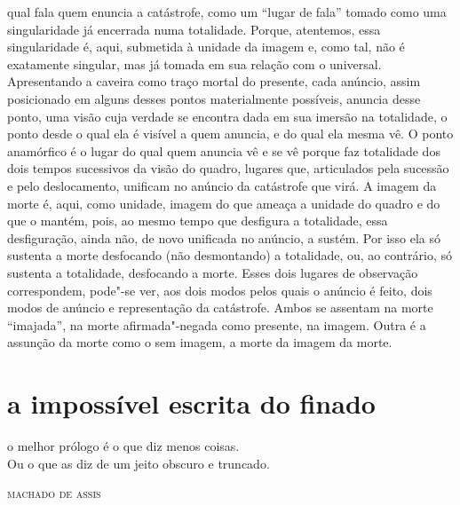 qual fala quem enuncia a catástrofe, como um ``lugar de fala'' tomado
como uma singularidade já encerrada numa totalidade. Porque, atentemos,
essa singularidade é, aqui, submetida à unidade da imagem e, como tal,
não é exatamente singular, mas já tomada em sua relação com o universal.
Apresentando a caveira como traço mortal do presente, cada anúncio,
assim posicionado em alguns desses pontos materialmente possíveis,
anuncia desse ponto, uma visão cuja verdade se encontra dada em sua
imersão na totalidade, o ponto desde o qual ela é visível a quem
anuncia, e do qual ela mesma vê. O ponto anamórfico é o lugar do qual
quem anuncia vê e se vê porque faz totalidade dos dois tempos sucessivos
da visão do quadro, lugares que, articulados pela sucessão e pelo
deslocamento, unificam no anúncio da catástrofe que virá. A imagem da
morte é, aqui, como unidade, imagem do que ameaça a unidade do quadro e
do que o mantém, pois, ao mesmo tempo que desfigura a totalidade, essa
desfiguração, ainda não, de novo unificada no anúncio, a sustém. Por
isso ela só sustenta a morte desfocando (não desmontando) a totalidade,
ou, ao contrário, só sustenta a totalidade, desfocando a morte. Esses
dois lugares de observação correspondem, pode"-se ver, aos dois modos
pelos quais o anúncio é feito, dois modos de anúncio e representação da
catástrofe. Ambos se assentam na morte ``imajada'', na morte
afirmada"-negada como presente, na imagem. Outra é a assunção da morte
como o sem imagem, a morte da imagem da morte.

\section{a impossível escrita do finado}


{\setlength{\epigraphwidth}{.55\textwidth}
\epigraph{o melhor prólogo é o que diz menos coisas.\\
Ou o que as diz de um jeito obscuro e truncado.}{\textsc{machado de assis}}}

